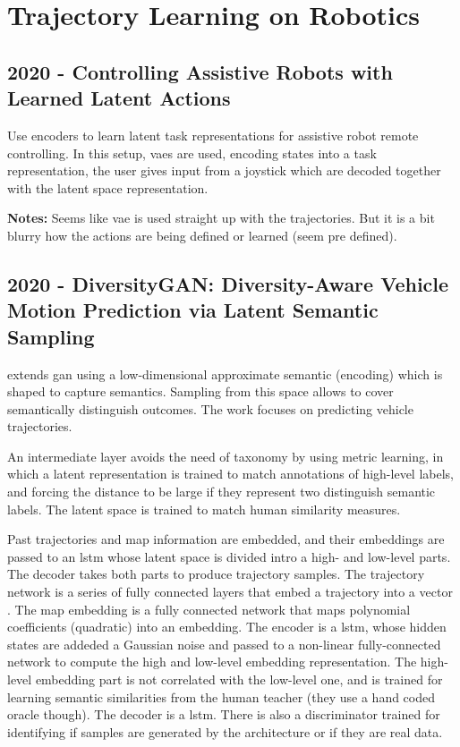 \section{Trajectory Learning on Robotics}\label{sec: traj learning robotics}

\subsection*{2020 - Controlling Assistive Robots with Learned Latent Actions}

\cite{losey2020controlling} Use encoders to learn latent task representations for assistive robot remote controlling. In this setup, \glspl{vae} are used, encoding states into a task representation, the user gives input from a joystick which are decoded together with the latent space representation.

\textbf{Notes:} Seems like \gls{vae} is used straight up with the trajectories. But it is a bit blurry how the actions are being defined or learned (seem pre defined).

\subsection*{2020 - DiversityGAN: Diversity-Aware Vehicle Motion Prediction via Latent Semantic Sampling}

\cite{huang2020diversitygan} extends \gls{gan} using a low-dimensional approximate semantic (encoding) which is shaped to capture semantics. Sampling from this space allows to cover semantically distinguish outcomes. The work focuses on predicting vehicle trajectories.

An intermediate layer avoids the need of taxonomy  by using metric learning, in which a latent representation is trained to match annotations of high-level labels, and forcing the distance to be large if they represent two distinguish semantic labels.
%
The latent space is trained to match human similarity measures.

Past trajectories and map information are embedded, and their embeddings are passed to an \gls{lstm} whose latent space is divided intro a high- and low-level parts. The decoder takes both parts to produce trajectory samples.
%
The trajectory network is a series of fully connected layers that embed a trajectory into a vector \cite{alahi2016social} .
%
The map embedding is a fully connected network that maps polynomial coefficients (quadratic) into an embedding.
%
The encoder is a \gls{lstm}, whose hidden states are addeded a Gaussian noise and passed to a non-linear fully-connected network to compute the high and low-level embedding representation. The high-level embedding part is not correlated with the low-level one, and is trained for learning semantic similarities from the human teacher (they use a hand coded oracle though).
%
The decoder is a \gls{lstm}.
%
There is also a discriminator trained for identifying if samples are generated by the architecture or if they are real data.

